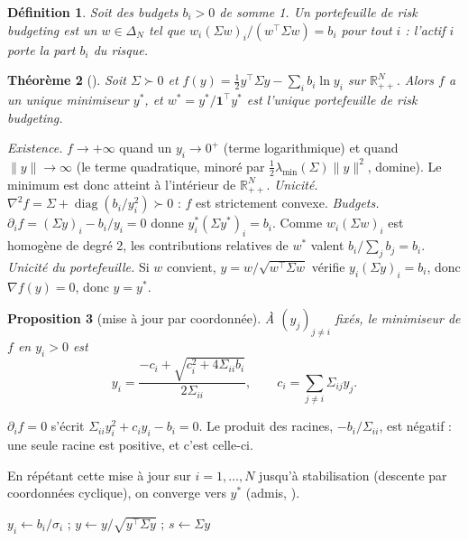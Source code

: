 \documentclass[11pt,a4paper]{article}
\makeatletter
\theoremstyle{pdef}
\newtheorem{definition}{Définition}[section]
\theoremstyle{pstate}
\newtheorem{proposition}[definition]{Proposition}
\newtheorem{theoreme}[definition]{Théorème}
\renewenvironment{proof}[1][\proofname]{\par\pushQED{\qed}\normalfont
  \topsep6pt\trivlist\item[\hskip\labelsep{\sffamily\bfseries #1.}]\ignorespaces}
  {\popQED\endtrivlist\@endpefalse}
\newcommand{\admis}[1]{{\upshape\small\color{ink2}(admis, #1)}}
\newcommand{\py}[1]{{\ttfamily\hyphenchar\font=-1 \detokenize{#1}}}
\newcommand{\R}{\mathbb{R}}
\newcommand{\one}{\mathbf{1}}
\newcommand{\T}{^{\top}}
\newcommand{\simplex}{\Delta_N}
\DeclareMathOperator{\diag}{diag}
\makeatother
\begin{document}
\begin{definition}
Soit des budgets $b_i>0$ de somme 1. Un portefeuille de risk budgeting est un
$w\in\simplex$ tel que $w_i(\Sigma w)_i/(w\T\Sigma w)=b_i$ pour tout $i$ : l'actif $i$
porte la part $b_i$ du risque.
\end{definition}

\begin{theoreme}[\citealp{spinu2013}]\label{thm:spinu}
Soit $\Sigma\succ0$ et $f(y)=\frac12y\T\Sigma y-\sum_ib_i\ln y_i$ sur $\R^N_{++}$. Alors $f$
a un unique minimiseur $y^\ast$, et $w^\ast=y^\ast/\one\T y^\ast$ est l'unique
portefeuille de risk budgeting.
\end{theoreme}

\begin{proof}
\emph{Existence.} $f\to+\infty$ quand un $y_i\to0^+$ (terme logarithmique) et quand
$\lVert y\rVert\to\infty$ (le terme quadratique, minoré par
$\frac12\lambda_{\min}(\Sigma)\lVert y\rVert^2$, domine). Le minimum est donc atteint à
l'intérieur de $\R^N_{++}$.
\emph{Unicité.} $\nabla^2f=\Sigma+\diag(b_i/y_i^2)\succ0$ : $f$ est strictement convexe.
\emph{Budgets.} $\partial_if=(\Sigma y)_i-b_i/y_i=0$ donne $y^\ast_i(\Sigma y^\ast)_i=b_i$.
Comme $w_i(\Sigma w)_i$ est homogène de degré 2, les contributions relatives de $w^\ast$
valent $b_i/\sum_jb_j=b_i$.
\emph{Unicité du portefeuille.} Si $w$ convient, $y=w/\sqrt{w\T\Sigma w}$ vérifie
$y_i(\Sigma y)_i=b_i$, donc $\nabla f(y)=0$, donc $y=y^\ast$.
\end{proof}

\begin{proposition}[mise à jour par coordonnée]\label{prop:ccd}
À $(y_j)_{j\ne i}$ fixés, le minimiseur de $f$ en $y_i>0$ est
\[
y_i=\frac{-c_i+\sqrt{c_i^2+4\Sigma_{ii}b_i}}{2\Sigma_{ii}},\qquad c_i=\sum_{j\ne i}\Sigma_{ij}y_j .
\]
\end{proposition}

\begin{proof}
$\partial_if=0$ s'écrit $\Sigma_{ii}y_i^2+c_iy_i-b_i=0$. Le produit des racines,
$-b_i/\Sigma_{ii}$, est négatif : une seule racine est positive, et c'est celle-ci.
\end{proof}

En répétant cette mise à jour sur $i=1,\dots,N$ jusqu'à stabilisation (descente par
coordonnées cyclique), on converge vers $y^\ast$ \admis{\citealp{tseng2001}}.

\begin{algorithm}[H]
\caption{Risk budgeting par descente par coordonnées (\py{RiskParity})}\label{alg:ccd}
$y_i\gets b_i/\sigma_i$ ; \quad $y\gets y/\sqrt{y\T\Sigma y}$ ; \quad $s\gets\Sigma y$\;
\KwRet{$w=y/\one\T y$}
\end{algorithm}
\end{document}
